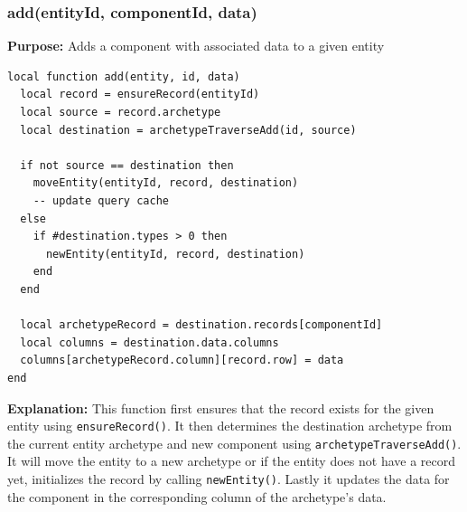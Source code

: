 \documentclass[openany, amssymb, psamsfonts]{amsart}
\theoremstyle{definition}
\numberwithin{equation}{section}
\begin{document}
\subsubsection{add(entityId, componentId, data)}
\textbf{Purpose:} Adds a component with associated data to a given entity
\begin{lstlisting}[style=lua]
local function add(entity, id, data)
  local record = ensureRecord(entityId)
  local source = record.archetype
  local destination = archetypeTraverseAdd(id, source)

  if not source == destination then 
    moveEntity(entityId, record, destination)
    -- update query cache
  else 
    if #destination.types > 0 then 
      newEntity(entityId, record, destination)
    end
  end

  local archetypeRecord = destination.records[componentId]
  local columns = destination.data.columns
  columns[archetypeRecord.column][record.row] = data
end

\end{lstlisting}
\textbf{Explanation:} 
This function first ensures that the record exists for the given entity using 
\texttt{ensureRecord()}. It then determines the destination archetype from the 
current entity archetype and new component using \texttt{archetypeTraverseAdd()}. 
It will move the entity to a new archetype or if the entity does not have a record yet, initializes
the record by calling \texttt{newEntity()}. Lastly it updates the data for the component in the
corresponding column of the archetype's data.
\end{document}
